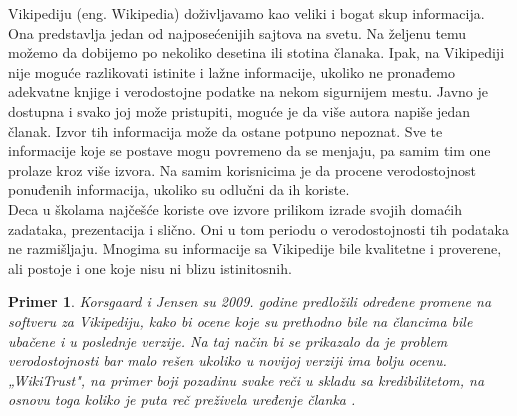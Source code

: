 \documentclass[a4paper]{article}
\newtheorem{primer}{Primer}[section]
\begin{document}
Vikipediju (eng. Wikipedia) doživljavamo kao veliki i bogat skup informacija. Ona predstavlja jedan od najposećenijih sajtova na svetu. Na željenu temu možemo da dobijemo po nekoliko desetina ili stotina članaka. Ipak, na Vikipediji nije moguće razlikovati istinite i lažne informacije, ukoliko ne pronađemo adekvatne knjige i verodostojne podatke na nekom sigurnijem mestu. Javno je dostupna i svako joj može pristupiti, moguće je da više autora napiše jedan članak. Izvor tih informacija može da ostane potpuno nepoznat. Sve te informacije koje se postave mogu povremeno da se menjaju, pa samim tim one prolaze kroz više izvora. Na samim korisnicima je da procene verodostojnost ponuđenih informacija, ukoliko su odlučni da ih koriste. \\Deca u školama najčešće koriste ove izvore prilikom izrade svojih domaćih zadataka, prezentacija i slično. Oni u tom periodu o verodostojnosti tih podataka ne razmišljaju. Mnogima su informacije sa Vikipedije bile kvalitetne i proverene, ali postoje i one koje nisu ni blizu istinitosnih.
\begin{primer}
Korsgaard i Jensen su 2009. godine predložili određene promene na softveru za Vikipediju, kako bi ocene koje su prethodno bile na člancima bile ubačene i u poslednje verzije. Na taj način bi se prikazalo da je problem verodostojnosti bar malo rešen ukoliko u novijoj verziji ima bolju ocenu. „WikiTrust", na primer boji pozadinu svake reči u skladu sa kredibilitetom, na osnovu toga koliko je puta reč preživela uređenje članka \cite{tInOnl}.
\end{primer}
\end{document}

